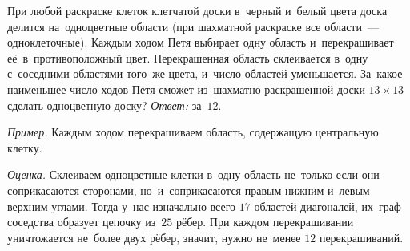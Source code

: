 \problem
При любой раскраске клеток клетчатой доски в~черный и~белый цвета доска делится
на~одноцветные области (при шахматной раскраске все области~--- одноклеточные).
Каждым ходом Петя выбирает одну область и~перекрашивает её~в~противоположный
цвет.
Перекрашенная область склеивается в~одну с~соседними областями того~же цвета,
и~число областей уменьшается.
За~какое наименьшее число ходов Петя сможет из~шахматно раскрашенной доски
$13 \times 13$ сделать одноцветную доску? 
\solution
\emph{Ответ:} за~$12$.
\par
\emph{Пример.}
Каждым ходом перекрашиваем область, содержащую центральную клетку. 
\par
\emph{Оценка.}
Склеиваем одноцветные клетки в~одну область не~только если они соприкасаются
сторонами, но~и~соприкасаются правым нижним и~левым верхним углами.
Тогда у~нас изначально всего $17$ областей-диагоналей, их~граф соседства
образует цепочку из~$25$ рёбер.
При каждом перекрашивании уничтожается не~более двух рёбер, значит, нужно
не~менее $12$ перекрашиваний.
\endproblem
